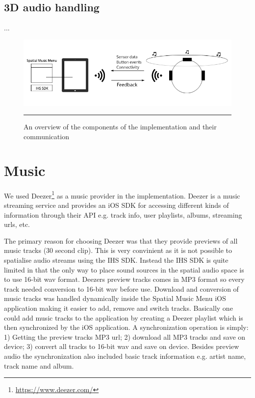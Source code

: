 \subsection{3D audio handling}
...

\begin{figure}[htbp]
	\centering
		\includegraphics[width=\textwidth,height=\textheight,keepaspectratio]{./Figures/implementation_overview.png}
		\rule{35em}{1pt}
	\caption[Implementation overview]{An overview of the components of the implementation and their communication}
	\label{fig:implementationoverview}
\end{figure}


\section{Music}
We used Deezer\footnote{\url{https://www.deezer.com/}} as a music provider in the implementation. Deezer is a music streaming service and provides an iOS SDK for accessing different kinds of information through their API e.g. track info, user playlists, albums, streaming urls, etc.

The primary reason for choosing Deezer was that they provide previews of all music tracks (30 second clip). This is very convinient as it is not possible to spatialise audio streams using the IHS SDK. Instead the IHS SDK is quite limited in that the only way to place sound sources in the spatial audio space is to use 16-bit wav format. Deezers preview tracks comes in MP3 format so every track needed conversion to 16-bit wav before use. Download and conversion of music tracks was handled dynamically inside the Spatial Music Menu iOS application making it easier to add, remove and switch tracks. Basically one could add music tracks to the application by creating a Deezer playlist which is then synchronized by the iOS application. A synchronization operation is simply: 1) Getting the preview tracks MP3 url; 2) download all MP3 tracks and save on device; 3) convert all tracks to 16-bit wav and save on device. Besides preview audio the synchronization also included basic track information e.g. artist name, track name and album.


